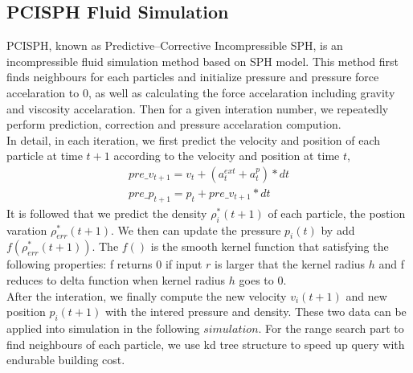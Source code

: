 \documentclass[acmtog]{acmart}
\begin{document}
\subsection{PCISPH Fluid Simulation}
PCISPH, known as Predictive–Corrective Incompressible SPH, is an incompressible fluid simulation method based on SPH model. 
This method first finds neighbours for each particles and initialize pressure and pressure force accelaration to 0, as well as calculating the force accelaration including gravity and viscosity accelaration.
Then for a given interation number, we repeatedly perform prediction, correction and pressure accelaration compution. \\
In detail, in each iteration, we first predict the velocity and position of each particle at time $t+1$ according to the velocity and position at time $t$,
\begin{gather*}
    pre\_v_{t+1} = v_t + (a^{ext}_t + a^{p}_t) * dt \\
    pre\_p_{t+1} = p_t + pre\_v_{t+1} * dt
\end{gather*}
It is followed that we predict the density $\rho _i^*(t+1)$ of each particle, the postion varation $\rho_{err}^*(t+1)$. 
We then can update the pressure $p_i(t)$ by add $f(\rho_{err}^*(t+1))$. The $f()$ is the smooth kernel function that satisfying the following properties:
f returns 0 if input $r$ is larger that the kernel radius $h$ and f reduces to delta function when kernel radius $h$ goes to 0.\\
After the interation, we finally compute the new velocity $v_i(t+1)$ and new position $p_i(t+1)$ with the intered pressure and density. 
These two data can be applied into simulation in the following $simulation$.
For the range search part to find neighbours of each particle, we use kd tree structure to speed up query with endurable building cost.
\end{document}

